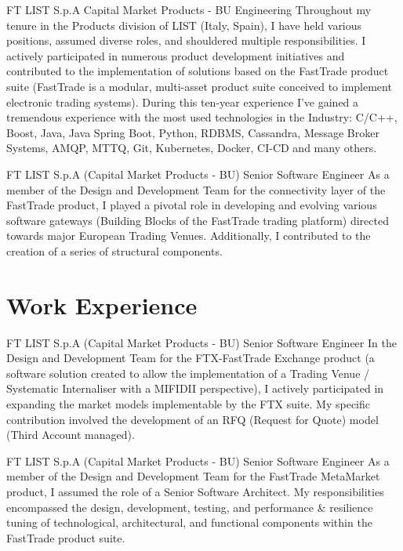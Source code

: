 \documentclass[10pt]{article} %
\begin{document}
\begin{paracol}{2}
{FT}
{LIST S.p.A} %
{Capital Market Products - BU}
{Engineering}
{Throughout my tenure in the Products division of LIST (Italy, Spain), I have held various positions,
assumed diverse roles, and shouldered multiple responsibilities. I actively participated in numerous
product development initiatives and contributed to the implementation of solutions based on the
FastTrade product suite (FastTrade is a modular, multi-asset product suite conceived to implement
electronic trading systems). During this ten-year experience I've gained a tremendous experience
with the most used technologies in the Industry: C/C++, Boost, Java, Java Spring Boot, Python,
RDBMS, Cassandra, Message Broker Systems, AMQP, MTTQ, Git, Kubernetes, Docker, CI-CD and many others.}

{FT} %
{LIST S.p.A (Capital Market Products - BU)} %
{Senior Software Engineer} %
{As a member of the Design and Development Team for the connectivity layer of the FastTrade product,
I played a pivotal role in developing and evolving various software gateways (Building Blocks of the
FastTrade trading platform) directed towards major European Trading Venues.
Additionally, I contributed to the creation of a series of structural components.} %

\newpage

\section{Work Experience}

{FT} %
{LIST S.p.A (Capital Market Products - BU)} %
{Senior Software Engineer} %
{In the Design and Development Team for the FTX-FastTrade Exchange product (a software solution created
to allow the implementation of a Trading Venue / Systematic Internaliser with a MIFIDII perspective),
I actively participated in expanding the market models implementable by the FTX suite.
My specific contribution involved the development of an RFQ (Request for Quote) model
(Third Account managed).} %

{FT} %
{LIST S.p.A (Capital Market Products - BU)} %
{Senior Software Engineer} %
{As a member of the Design and Development Team for the FastTrade MetaMarket product, I assumed the role
of a Senior Software Architect. My responsibilities encompassed the design, development, testing, and
performance \& resilience tuning of technological, architectural, and functional components within the
FastTrade product suite.} %


\end{paracol}
\end{document}
